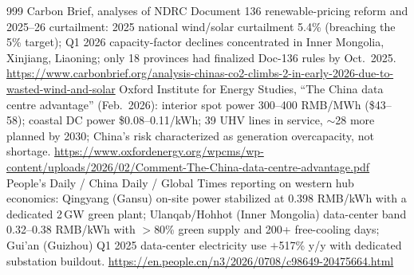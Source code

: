 \begin{thebibliography}{999}
 Carbon Brief, analyses of NDRC Document 136 renewable-pricing reform and 2025--26 curtailment: 2025 national wind/solar curtailment 5.4\% (breaching the 5\% target); Q1 2026 capacity-factor declines concentrated in Inner Mongolia, Xinjiang, Liaoning; only 18 provinces had finalized Doc-136 rules by Oct.\ 2025. \url{https://www.carbonbrief.org/analysis-chinas-co2-climbs-2-in-early-2026-due-to-wasted-wind-and-solar}
 Oxford Institute for Energy Studies, ``The China data centre advantage'' (Feb.\ 2026): interior spot power 300--400 RMB/MWh (\$43--58); coastal DC power \$0.08--0.11/kWh; 39 UHV lines in service, $\sim$28 more planned by 2030; China's risk characterized as generation overcapacity, not shortage. \url{https://www.oxfordenergy.org/wpcms/wp-content/uploads/2026/02/Comment-The-China-data-centre-advantage.pdf}
 People's Daily / China Daily / Global Times reporting on western hub economics: Qingyang (Gansu) on-site power stabilized at 0.398 RMB/kWh with a dedicated 2\,GW green plant; Ulanqab/Hohhot (Inner Mongolia) data-center band 0.32--0.38 RMB/kWh with $>$80\% green supply and 200+ free-cooling days; Gui'an (Guizhou) Q1 2025 data-center electricity use $+$517\% y/y with dedicated substation buildout. \url{https://en.people.cn/n3/2026/0708/c98649-20475664.html}


\end{thebibliography}
